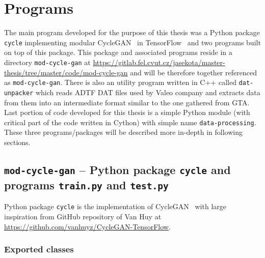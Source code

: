 \chapter{Programs} \label{programs}

The main program developed for the purpose of this thesis was a Python package \texttt{cycle} implementing modular CycleGAN~\cite{cyclegan} in TensorFlow~\cite{tensorflow} and two programs built on top of this package. This package and associated programs reside in a directory \texttt{mod-cycle-gan} at \url{https://gitlab.fel.cvut.cz/jasekota/master-thesis/tree/master/code/mod-cycle-gan} and will be therefore together referenced as \texttt{mod-cycle-gan}. There is also an utility program written in C++ called \texttt{dat-unpacker} which reads ADTF DAT files used by Valeo company and extracts data from them into an intermediate format similar to the one gathered from GTA. Last portion of code developed for this thesis is a simple Python module (with critical part of the code written in Cython) with simple name \texttt{data-processing}. These three programs/packages will be described more in-depth in following sections.

\section[\texttt{mod-cycle-gan}]{\texttt{mod-cycle-gan} -- Python package \texttt{cycle} and programs \texttt{train.py} and \texttt{test.py}}

Python package \texttt{cycle} is the implementation of CycleGAN~\cite{cyclegan} with large inspiration from GitHub repository of Van Huy at \url{https://github.com/vanhuyz/CycleGAN-TensorFlow}.

\subsection{Exported classes}


